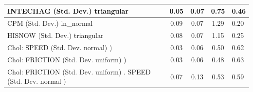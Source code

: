 \begin{table}
\begin{center}
\begin{tabular}{|l|l|c|c|c|l|}
			INTECHAG (Std. Dev.) triangular &  & 0.05 & 0.07 & 0.75 & 0.46 \\
			\hline
			CPM (Std. Dev.) ln_normal &  & 0.09 & 0.07 & 1.29 & 0.20 \\
			\hline
			HISNOW (Std. Dev.) triangular &  & 0.08 & 0.07 & 1.15 & 0.25 \\
			\hline
			 Chol: SPEED (Std. Dev. normal) ) &  & 0.03 & 0.06 & 0.50 & 0.62 \\
			\hline
			 Chol: FRICTION (Std. Dev. uniform) ) &  & 0.03 & 0.06 & 0.48 & 0.63 \\
			\hline
			 Chol: FRICTION (Std. Dev. uniform) . SPEED (Std. Dev.   normal ) &  & 0.07 & 0.13 & 0.53 & 0.59 \\
			\hline
		\end{tabular}
	\end{center}
\end{table}
